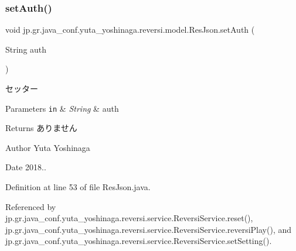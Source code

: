 \mbox{\label{classjp_1_1gr_1_1java__conf_1_1yuta__yoshinaga_1_1reversi_1_1model_1_1_res_json_aec94a5246bf7245af19f8f72100e986c}} 
\subsubsection{\texorpdfstring{set\+Auth()}{setAuth()}}
{\footnotesize\ttfamily void jp.\+gr.\+java\+\_\+conf.\+yuta\+\_\+yoshinaga.\+reversi.\+model.\+Res\+Json.\+set\+Auth (\begin{DoxyParamCaption}\item[{String}]{auth }\end{DoxyParamCaption})}



セッター 


\begin{DoxyParams}[1]{Parameters}
\mbox{\tt in}  & {\em String} & auth \\
\hline
\end{DoxyParams}
\begin{DoxyReturn}{Returns}
ありません 
\end{DoxyReturn}
\begin{DoxyAuthor}{Author}
Yuta Yoshinaga 
\end{DoxyAuthor}
\begin{DoxyDate}{Date}
2018.. 
\end{DoxyDate}


Definition at line 53 of file Res\+Json.\+java.



Referenced by jp.\+gr.\+java\+\_\+conf.\+yuta\+\_\+yoshinaga.\+reversi.\+service.\+Reversi\+Service.\+reset(), jp.\+gr.\+java\+\_\+conf.\+yuta\+\_\+yoshinaga.\+reversi.\+service.\+Reversi\+Service.\+reversi\+Play(), and jp.\+gr.\+java\+\_\+conf.\+yuta\+\_\+yoshinaga.\+reversi.\+service.\+Reversi\+Service.\+set\+Setting().

